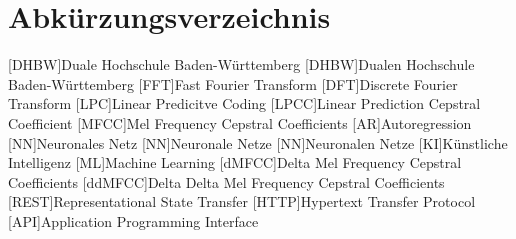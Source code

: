 \section*{Abkürzungsverzeichnis}
\begin{acronym}
  [DHBW]{Duale Hochschule Ba\-den-\-Würt\-tem\-berg}
  [DHBW]{Dualen Hochschule Ba\-den-\-Würt\-tem\-berg}
  [FFT]{Fast Fourier Transform}
  [DFT]{Discrete Fourier Transform}
  [LPC]{Linear Predicitve Coding}
  [LPCC]{Linear Prediction Cepstral Coefficient}
  [MFCC]{Mel Frequency Cepstral Coefficients}
  [AR]{Autoregression}
  [NN]{Neuronales Netz}
  [NN]{Neuronale Netze}
  [NN]{Neuronalen Netze}
  [KI]{Künstliche Intelligenz}
  [ML]{Machine Learning}
  [dMFCC]{Delta Mel Frequency Cepstral Coefficients}
  [ddMFCC]{Delta Delta Mel Frequency Cepstral Coefficients}
  [REST]{Representational State Transfer}
  [HTTP]{Hypertext Transfer Protocol}
  [API]{Application Programming Interface}

\end{acronym}
\newpage